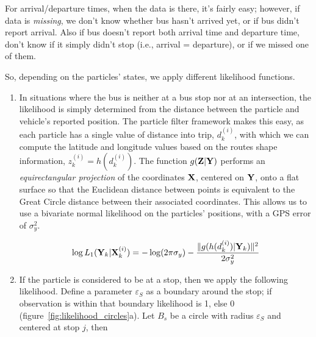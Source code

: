 \documentclass[draftcls,a4paper,onecolumn]{IEEEtran}\usepackage[]{graphicx}\usepackage[]{color}
\begin{document}
For arrival/departure times, when the data is there, it's fairly easy;
however, if data is \emph{missing}, we don't know whether bus hasn't arrived yet,
or if bus didn't report arrival.
Also if bus doesn't report both arrival time and departure time,
don't know if it simply didn't stop (i.e., arrival = departure),
or if we missed one of them.

So, depending on the particles' states, we apply different likelihood functions.

\begin{enumerate}
\item
In situations where the bus is neither at a bus stop nor at an intersection,
the likelihood is simply determined from the distance between the particle and 
vehicle's reported position.
The particle filter framework makes this easy,
as each particle has a single value of distance into trip, $d_k^{(i)}$,
with which we can compute the latitude and longitude values based on 
the routes shape information, $z_k^{(i)} = h(d_k^{(i)})$.
The function $g (\mathbf{Z} | \mathbf{Y})$ performs an \emph{equirectangular projection} \cite{Snyder_1998}
of the coordinates $\mathbf{X}$, centered on $\mathbf{Y}$, 
onto a flat surface so that the Euclidean distance between points is equivalent
to the Great Circle distance between their associated coordinates.
This allows us to use a bivariate normal likelihood on the particles' positions,
with a GPS error of $\sigma_y^2$.

\begin{equation}
  \label{eq:l1}
  \log L_1 (\mathbf{Y}_k | \mathbf{X}_k^{(i)}) = - \log(2\pi\sigma_y) - \frac{\|g(h(d_k^{(i)})|\mathbf{Y}_k)\|^2}{2\sigma_y^2}
\end{equation}


\item
If the particle is considered to be at a stop, then we apply the following likelihood.
Define a parameter $\varepsilon_S$ as a boundary around the stop;
if observation is within that boundary likelihood is 1, else 0 (figure~\ref{fig:likelihood_circles}a).
Let $B_s$ be a circle with radius $\varepsilon_S$ and centered at stop $j$, then


\end{enumerate}
\end{document}
